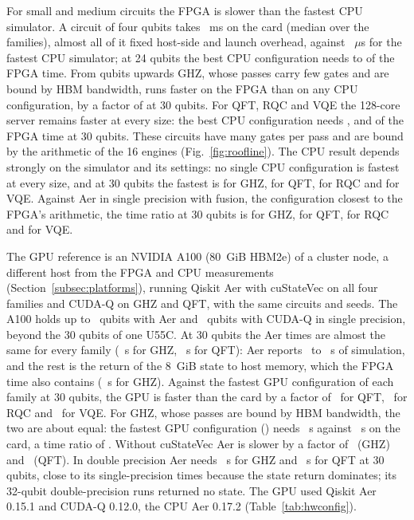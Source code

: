 For small and medium circuits the FPGA is slower than the fastest CPU simulator. A circuit of four qubits takes \NumXplatFpgaSmallMs~ms on the card (median over the families), almost all of it fixed host-side and launch overhead, against \NumXplatCpuSmallUs~$\mu$s for the fastest CPU simulator; at 24 qubits the best CPU configuration needs \NumXplatRatioTwentyFourMin to \NumXplatRatioTwentyFourMax{} of the FPGA time. From \NumXplatGhzCrossN{} qubits upwards GHZ, whose passes carry few gates and are bound by HBM bandwidth, runs faster on the FPGA than on any CPU configuration, by a factor of \NumXplatRatioGhzThirty{} at 30 qubits. For QFT, RQC and VQE the 128-core server remains faster at every size: the best CPU configuration needs \NumXplatRatioQftThirty, \NumXplatRatioRqcThirty{} and \NumXplatRatioVqeThirty{} of the FPGA time at 30 qubits. These circuits have many gates per pass and are bound by the arithmetic of the 16 engines (Fig.~\ref{fig:roofline}). The CPU result depends strongly on the simulator and its settings: no single CPU configuration is fastest at every size, and at 30 qubits the fastest is \NumXplatBestCpuGhzThirty{} for GHZ, \NumXplatBestCpuQftThirty{} for QFT, \NumXplatBestCpuRqcThirty{} for RQC and \NumXplatBestCpuVqeThirty{} for VQE. Against Aer in single precision with fusion, the configuration closest to the FPGA's arithmetic, the time ratio at 30 qubits is \NumXplatAerRatioGhzThirty{} for GHZ, \NumXplatAerRatioQftThirty{} for QFT, \NumXplatAerRatioRqcThirty{} for RQC and \NumXplatAerRatioVqeThirty{} for VQE.

The GPU reference is an NVIDIA A100 (80~GiB HBM2e) of a cluster node, a different host from the FPGA and CPU
measurements (Section~\ref{subsec:platforms}), running Qiskit Aer with cuStateVec on all four families and CUDA-Q on GHZ and QFT, with the same circuits and
seeds. The A100 holds up to \NumGpuMaxN~qubits with Aer and \NumGpuCudaqSingleMaxN~qubits with CUDA-Q in single precision,
beyond the 30 qubits of one U55C. At 30 qubits the Aer times are almost the same for every family
(\NumXplatGpuTGhzThirty~s for GHZ, \NumXplatGpuTQftThirty~s for QFT): Aer reports \NumGpuAerTimeThirtyMin~to
\NumGpuAerTimeThirtyMax~s of simulation, and the rest is the return of the 8~GiB state to host memory, which the FPGA time
also contains (\NumFlagDtwohGhzThirty~s for GHZ). Against the fastest GPU configuration of each family at 30 qubits, the GPU
is faster than the card by a factor of \NumXplatBestGpuRatioQftThirty~for QFT, \NumXplatBestGpuRatioRqcThirty~for RQC and
\NumXplatBestGpuRatioVqeThirty~for VQE. For GHZ, whose passes are bound by HBM bandwidth, the two are about equal: the
fastest GPU configuration (\NumXplatBestGpuNameGhzThirty) needs \NumXplatBestGpuTGhzThirty~s against \NumFlagGhzThirtyEtoE~s on
the card, a time ratio of \NumXplatBestGpuRatioGhzThirty. Without cuStateVec Aer is slower by a factor of
\NumGpuCusvGainGhzThirty~(GHZ) and \NumGpuCusvGainQftThirty~(QFT). In double precision Aer needs \NumGpuAerDoubleTGhzThirty~s
for GHZ and \NumGpuAerDoubleTQftThirty~s for QFT at 30 qubits, close to its single-precision times because the state return
dominates; its 32-qubit double-precision runs returned no state. The GPU used Qiskit Aer 0.15.1 and CUDA-Q 0.12.0, the CPU
Aer 0.17.2 (Table~\ref{tab:hwconfig}).


